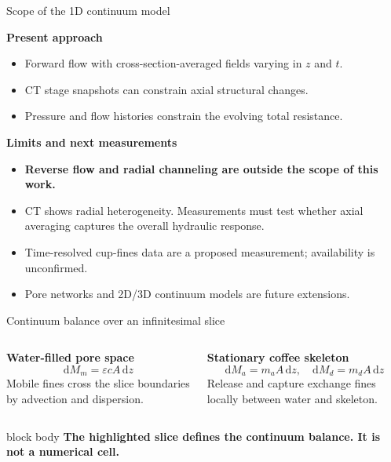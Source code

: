 \documentclass[aspectratio=169,11pt]{beamer}
\newcommand{\hi}[1]{\textcolor{tumblue}{\textbf{#1}}}
\newcommand{\takeaway}[1]{%
  \begin{beamercolorbox}[rounded=true,sep=.55em]{block body}
    \centering\color{tumdark}\textbf{#1}
  \end{beamercolorbox}}
\begin{document}
\begin{frame}{Scope of the 1D continuum model}
\small

\hi{Present approach}
\begin{itemize}
\item Forward flow with cross-section-averaged fields varying in $z$ and $t$.
\item CT stage snapshots can constrain axial structural changes.
\item Pressure and flow histories constrain the evolving total resistance.
\end{itemize}
\medskip
\hi{Limits and next measurements}
\begin{itemize}
\item \textbf{Reverse flow and radial channeling are outside the scope of this work.}
\item CT shows radial heterogeneity. Measurements must test whether axial averaging captures the overall hydraulic response.
\item Time-resolved cup-fines data are a proposed measurement; availability is unconfirmed.
\item Pore networks and 2D/3D continuum models are future extensions.
\end{itemize}

\end{frame}

\begin{frame}{Continuum balance over an infinitesimal slice}
\begin{columns}[c,onlytextwidth]
\centering
{}
\small
\hi{Water-filled pore space}
\[\mathrm dM_m=\varepsilon c A\,\mathrm dz\]
Mobile fines cross the slice boundaries by advection and dispersion.
\par\medskip
\hi{Stationary coffee skeleton}
\[\mathrm dM_a=m_a A\,\mathrm dz,\quad\mathrm dM_d=m_d A\,\mathrm dz\]
Release and capture exchange fines locally between water and skeleton.
\end{columns}
\vfill\takeaway{The highlighted slice defines the continuum balance. It is not a numerical cell.}
\end{frame}
\end{document}
